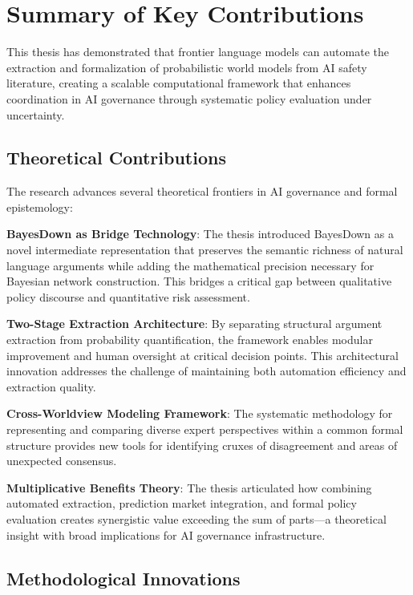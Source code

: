 \documentclass[
  11pt,
  letterpaper,
]{book}
\begin{document}
\section{Summary of Key Contributions}\label{sec-key-contributions}

This thesis has demonstrated that frontier language models can automate
the extraction and formalization of probabilistic world models from AI
safety literature, creating a scalable computational framework that
enhances coordination in AI governance through systematic policy
evaluation under uncertainty.

\subsection{Theoretical
Contributions}\label{sec-theoretical-contributions}

The research advances several theoretical frontiers in AI governance and
formal epistemology:

\textbf{BayesDown as Bridge Technology}: The thesis introduced BayesDown
as a novel intermediate representation that preserves the semantic
richness of natural language arguments while adding the mathematical
precision necessary for Bayesian network construction. This bridges a
critical gap between qualitative policy discourse and quantitative risk
assessment.

\textbf{Two-Stage Extraction Architecture}: By separating structural
argument extraction from probability quantification, the framework
enables modular improvement and human oversight at critical decision
points. This architectural innovation addresses the challenge of
maintaining both automation efficiency and extraction quality.

\textbf{Cross-Worldview Modeling Framework}: The systematic methodology
for representing and comparing diverse expert perspectives within a
common formal structure provides new tools for identifying cruxes of
disagreement and areas of unexpected consensus.

\textbf{Multiplicative Benefits Theory}: The thesis articulated how
combining automated extraction, prediction market integration, and
formal policy evaluation creates synergistic value exceeding the sum of
parts---a theoretical insight with broad implications for AI governance
infrastructure.

\subsection{Methodological
Innovations}\label{sec-methodological-innovations}
\end{document}
